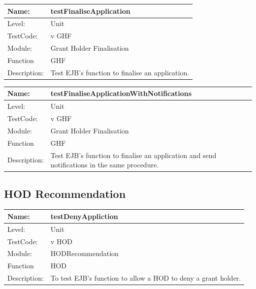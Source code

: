 \documentclass[12pt]{article}
\begin{document}
\begin{center}
\begin{tabular}{|l|p{12cm}|}
\hline

 Name: & testFinaliseApplication  \\
\hline
Level: & Unit \\
\hline
TestCode: & v GHF \\
\hline
Module:& Grant Holder Finalisation \\
\hline
Function & GHF \\
\hline
Description: & Test EJB's function to finalise an application. \\
\hline
\end{tabular}
\end{center}

\begin{center}
\begin{tabular}{|l|p{12cm}|}
\hline

 Name: & testFinaliseApplicationWithNotifications  \\
\hline
Level: & Unit \\
\hline
TestCode: & v GHF \\
\hline
Module:& Grant Holder Finalisation \\
\hline
Function & GHF \\
\hline
Description: & Test EJB's function to finalise an application and send notifications in the same procedure. \\
\hline
\end{tabular}
\end{center}

\subsection{HOD Recommendation}

\begin{center}
\begin{tabular}{|l|p{12cm}|}
\hline

 Name: & testDenyAppliction  \\
\hline
Level: & Unit \\
\hline
TestCode: & v HOD \\
\hline
Module:& HODRecommendation \\
\hline
Function & HOD \\
\hline
Description: & To test EJB's function to allow a HOD to deny a grant holder. \\
\hline
\end{tabular}
\end{center}
\end{document}
